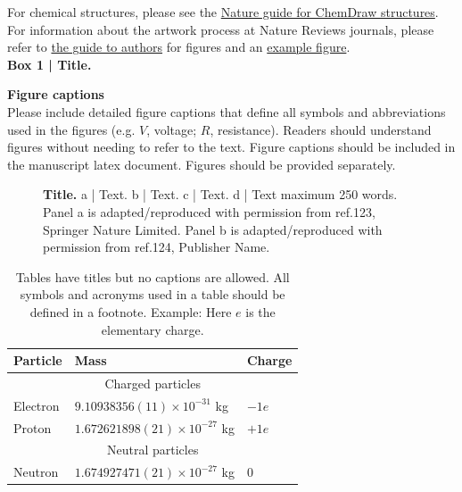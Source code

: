 \documentclass[fleqn,10pt]{wlscirep}
\begin{document}
\noindent For chemical structures, please see the \href {https://www.nature.com/documents/nr-chemical-structures-guide.pdf}{Nature guide for ChemDraw structures}.\\

\noindent For information about the artwork process at Nature Reviews journals, please refer to \href{https://www.nature.com/reviews/pdf/artworkguide.pdf}{the guide to authors} for figures and an  \href{http://www.nature.com/reviews/pdf/artworkguidep2.pdf}{example figure}.\\

\noindent \textbf{Box 1 | Title.}

\noindent \textbf{Figure captions}\\
\noindent Please include detailed figure captions that define all symbols and abbreviations used in the figures (e.g. $V$, voltage; $R$, resistance). Readers should understand figures without needing to refer to the text. Figure captions should be included in the manuscript latex document. Figures should be provided separately.\\

\begin{figure}[ht]
\centering
\caption{\textbf{Title.} a | Text. b | Text. c | Text. d | Text maximum 250 words. Panel a is adapted/reproduced with permission from ref.123, Springer Nature Limited. Panel b is adapted/reproduced with permission from ref.124, Publisher Name.}
\label{fig}
\end{figure}



\begin{table}[ht]
\centering
\begin{tabular}{|l|l|l|}
\hline
Particle & Mass & Charge \\
\hline
 \multicolumn{3}{|c|}{Charged particles}\\
\hline
Electron & $9.10938356(11)\times10^{-31}$ kg & $-1e$ \\
\hline
Proton & $1.672621898(21)\times10^{-27}$ kg & $+1e$ \\
\hline
 \multicolumn{3}{|c|}{Neutral particles}\\
\hline
Neutron & $1.674927471(21)\times10^{-27}$ kg & $0$ \\
\hline
\end{tabular}
\caption{\label{tab}Tables have titles but no captions are allowed. All symbols and acronyms used in a table should be defined in a footnote. Example: Here $e$ is the elementary charge.}
\end{table}
\end{document}
